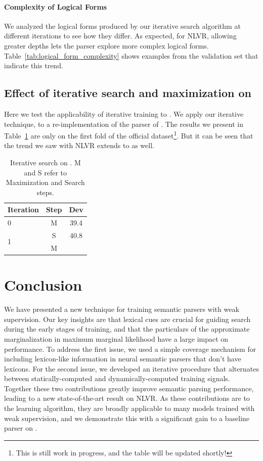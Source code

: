\paragraph{Complexity of Logical Forms} We analyzed the logical forms produced
by our iterative search algorithm at different iterations to see how they
differ. As expected, for NLVR, allowing greater depths lets the parser explore
more complex logical forms. Table~\ref{tab:logical_form_complexity} shows
examples from the validation set that indicate this trend.

\subsection{Effect of iterative search and maximization on \WTQ{}}
Here we test the applicability of iterative training to \WTQ\@. We apply
our iterative technique, to a
re-implementation of the parser of \citet{krishnamurthy2017neural}.
The results we present in Table~\ref{tab:iterative_search_wtq} are only on the first fold of the official
dataset\footnote{This is still work in progress, and the table will be updated
shortly!}. But it can be seen that the trend we saw with NLVR extends to \WTQ{}
as well.

\begin{table}
	\centering
	\begin{tabular}{lcc}
	\toprule
	Iteration & Step & Dev \\
	\midrule
	0 & M & 39.4 \\
	\hline
	\multirow{2}{*}{1} & S & 40.8 \\
	& M &  \\
	\bottomrule
	\end{tabular}
	\caption{Iterative search on \WTQ{}.  M and S refer to Maximization and Search steps.}\label{tab:iterative_search_wtq}
\end{table}


\section{Conclusion}
We have presented a new technique for training semantic parsers with weak
supervision.  Our key insights are that lexical cues are crucial for guiding
search during the early stages of training, and that the particulars of the
approximate marginalization in maximum marginal likelihood have a large impact
on performance.  To address the first issue, we used a simple coverage mechanism
for including lexicon-like information in neural semantic parsers that don't
have lexicons.  For the second issue, we developed an iterative procedure that
alternates between statically-computed and dynamically-computed training
signals.  Together these two contributions greatly improve semantic parsing
performance, leading to a new state-of-the-art result on NLVR\@.  As these
contributions are to the learning algorithm, they are broadly applicable to many
models trained with weak supervision, and we demonstrate this with a significant 
gain to a baseline parser on \WTQ{}.

